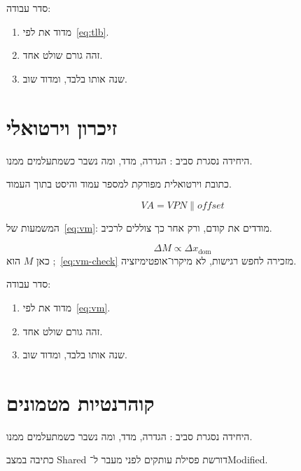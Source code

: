 סדר עבודה:
\begin{enumerate}
\item[(\textbf{א})] מדוד את  לפי~\eqref{eq:tlb}.
\item[(\textbf{ב})] זהה גורם שולט אחד.
\item[(\textbf{ג})] שנה אותו בלבד, ומדוד שוב.
\end{enumerate}

\chapter{זיכרון וירטואלי}
\label{ch:vm}

היחידה נסגרת סביב : הגדרה, מדד, ומה נשבר כשמתעלמים ממנו.

\begin{defbox}[frametitle={הגדרה — זיכרון וירטואלי}]
כתובת וירטואלית מפורקת למספר עמוד והיסט בתוך העמוד.
\end{defbox}

\begin{equation}
\label{eq:vm}
VA = VPN \| offset
\end{equation}

המשמעות של~\eqref{eq:vm}: מודדים את  קודם, ורק אחר כך צוללים לרכיב.

\begin{equation}
\label{eq:vm-check}
\Delta M \propto \Delta x_{\mathrm{dom}}
\end{equation}
כאן $M$ הוא ;~\eqref{eq:vm-check} מזכירה לחפש רגישות, לא מיקרו־אופטימיזציה.

סדר עבודה:
\begin{enumerate}
\item[(\textbf{א})] מדוד את  לפי~\eqref{eq:vm}.
\item[(\textbf{ב})] זהה גורם שולט אחד.
\item[(\textbf{ג})] שנה אותו בלבד, ומדוד שוב.
\end{enumerate}

\chapter{קוהרנטיות מטמונים}
\label{ch:coherency}

היחידה נסגרת סביב : הגדרה, מדד, ומה נשבר כשמתעלמים ממנו.

\begin{warnbox}[frametitle={מלכודת — קוהרנטיות מטמונים}]
כתיבה במצב Shared דורשת פסילת עותקים לפני מעבר ל־Modified.
\end{warnbox}

